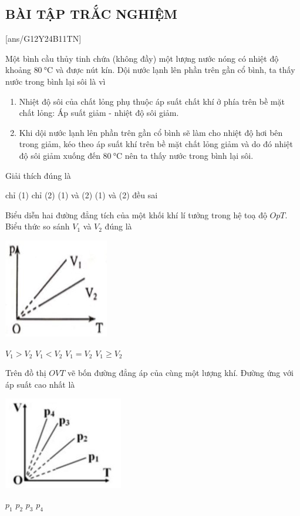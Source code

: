 \subsection{BÀI TẬP TRẮC NGHIỆM}
\setcounter{ex}{0}
[ans/G12Y24B11TN]
\begin{ex}
	Một bình cầu thủy tinh chứa (không đầy) một lượng nước nóng có nhiệt độ khoảng $\SI{80}{\celsius}$ và được nút kín. Dội nước lạnh lên phần trên gần cổ bình, ta thấy nước trong bình lại sôi là vì
	\begin{enumerate}[label=(\arabic*)]
		\item Nhiệt độ sôi của chất lỏng phụ thuộc áp suất chất khí ở phía trên bề mặt chất lỏng: Áp suất giảm - nhiệt độ sôi giảm.
		\item Khi dội nước lạnh lên phần trên gần cổ bình sẽ làm cho nhiệt độ hơi bên trong giảm, kéo
		theo áp suất khí trên bề mặt chất lỏng giảm và do đó nhiệt độ sôi giảm xuống đến $\SI{80}{\celsius}$ nên ta thấy nước trong bình lại sôi.
	\end{enumerate}
	Giải thích đúng là
	
	\choice
	{chỉ (1)}
	{chỉ (2)}
	{\True (1) và (2)}
	{(1) và (2) đều sai}
	\loigiai{}
\end{ex}
\begin{ex}
	Biểu diễn hai đường đẳng tích của một khối khí lí tưởng trong hệ toạ độ $OpT$. Biểu thức so sánh $V_1$ và $V_2$ đúng là
	\begin{center}
		\includegraphics[width=0.2\linewidth]{figs/VN12-Y24-PH-SYL-012P-1}
	\end{center}
	\choice
	{$V_1>V_2$}
	{\True $V_1<V_2$}
	{$V_1=V_2$}
	{$V_1\ge V_2$}
	\loigiai{}
\end{ex}
\begin{ex}
Trên đồ thị $OVT$ vẽ bốn đường đẳng áp của cùng một lượng khí. Đường ứng với áp suất cao nhất là
\begin{center}
	\includegraphics[width=0.2\linewidth]{figs/VN12-Y24-PH-SYL-012P-2}
\end{center}
	\choice
	{\True $p_1$}
	{$p_2$}
	{$p_3$}
	{$p_4$}
	\loigiai{}
\end{ex}
